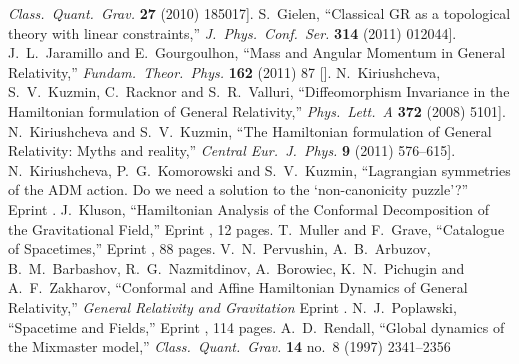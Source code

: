\begin{thebibliography}{99}
  \emph{Class.\ Quant.\ Grav.} {\bf 27} (2010) 185017\newblock
  [\arXiv[gr-qc]{1004.5371}].
  S.~Gielen,\newblock
  ``Classical GR as a topological theory with linear constraints,''\newblock
  \emph{J.\ Phys.\ Conf.\ Ser.} {\bf 314} (2011) 012044\newblock
  [\arXiv[gr-qc]{1011.5513}].
  J.~L.~Jaramillo and E.~Gourgoulhon,\newblock
  ``Mass and Angular Momentum in General Relativity,''\newblock
  \emph{Fundam.\ Theor.\ Phys.} {\bf 162} (2011) 87
  [].
  N.~Kiriushcheva, S.~V.~Kuzmin, C.~Racknor and S.~R.~Valluri,\newblock
  ``Diffeomorphism Invariance in the Hamiltonian formulation of General Relativity,''\newblock
  \emph{Phys.\ Lett.\ A} {\bf 372} (2008) 5101\newblock
  [\arXiv[gr-qc]{0808.2623}].
  N.~Kiriushcheva and S.~V.~Kuzmin,\newblock
  ``The Hamiltonian formulation of General Relativity: Myths and reality,''\newblock
  \emph{Central Eur.\ J.\ Phys.} {\bf 9} (2011) 576--615\newblock
  [\arXiv[gr-qc]{0809.0097}].
  N.~Kiriushcheva, P.~G.~Komorowski and S.~V.~Kuzmin,\newblock
  ``Lagrangian symmetries of the ADM action. Do we need a solution to the `non-canonicity puzzle'?''\newblock
  Eprint .
  J.~Kluson,\newblock
  ``Hamiltonian Analysis of the Conformal Decomposition of the Gravitational Field,''\newblock
  Eprint , 12 pages.
  T.~Muller and F.~Grave,\newblock
  ``Catalogue of Spacetimes,''\newblock
  Eprint , 88 pages.
  V.~N.~Pervushin, A.~B.~Arbuzov, B.~M.~Barbashov, R.~G.~Nazmitdinov, A.~Borowiec, K.~N.~Pichugin and A.~F.~Zakharov,\newblock
  ``Conformal and Affine Hamiltonian Dynamics of General Relativity,''\newblock
  \emph{ General Relativity and Gravitation}
  Eprint  .
  N.~J.~Poplawski,\newblock
  ``Spacetime and Fields,''\newblock
  Eprint , 114 pages.
  A.~D.~Rendall,\newblock
  ``Global dynamics of the Mixmaster model,''\newblock
  \emph{Class.\ Quant.\ Grav.} {\bf 14} no.~8 (1997) 2341--2356\newblock

\end{thebibliography}
